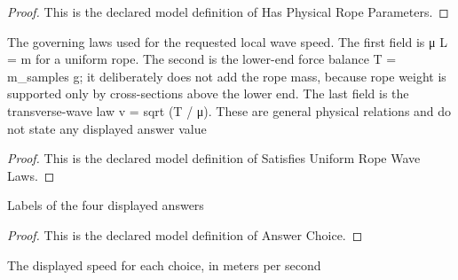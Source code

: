 \begin{proof}
  This is the declared model definition of Has Physical Rope Parameters.
\end{proof}
\begin{definition}
  \label{def:physics:phyx-mini-0188:phyxminiproblems-problemphyxmini0188-satisfiesuniformropewavelaws}
  The governing laws used for the requested local wave speed. The first field is μ L = m for a uniform rope. The second is the lower-end force balance T = m\_samples g; it deliberately does not add the rope mass, because rope weight is supported only by cross-sections above the lower end. The last field is the transverse-wave law v = sqrt (T / μ). These are general physical relations and do not state any displayed answer value
\end{definition}
\begin{proof}
  This is the declared model definition of Satisfies Uniform Rope Wave Laws.
\end{proof}
\begin{definition}
  \label{def:physics:phyx-mini-0188:phyxminiproblems-problemphyxmini0188-answerchoice}
  Labels of the four displayed answers
\end{definition}
\begin{proof}
  This is the declared model definition of Answer Choice.
\end{proof}
\begin{definition}
  \label{def:physics:phyx-mini-0188:phyxminiproblems-problemphyxmini0188-displayedanswerspeedinmeterspersecond}
  The displayed speed for each choice, in meters per second
\end{definition}
